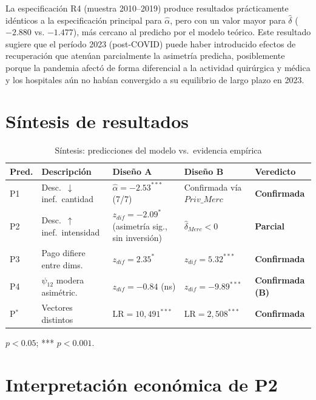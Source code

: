 \documentclass[12pt, a4paper, twoside, openright]{book}
\theoremstyle{plain}
\theoremstyle{definition}
\theoremstyle{remark}
\begin{document}
La especificación R4 (muestra 2010--2019) produce resultados prácticamente idénticos a la especificación principal para $\hat{\alpha}$, pero con un valor mayor para $\hat{\delta}$ ($-2.880$ vs. $-1.477$), más cercano al predicho por el modelo teórico. Este resultado sugiere que el período 2023 (post-COVID) puede haber introducido efectos de recuperación que atenúan parcialmente la asimetría predicha, posiblemente porque la pandemia afectó de forma diferencial a la actividad quirúrgica y médica y los hospitales aún no habían convergido a su equilibrio de largo plazo en 2023.

\section{Síntesis de resultados}

\begin{table}[htbp]
\centering
\caption{Síntesis: predicciones del modelo vs.\ evidencia empírica}
\label{tab:sintesis}
\begin{threeparttable}
\small
\begin{tabular}{p{0.8cm}p{3.5cm}p{3cm}p{3cm}p{1.5cm}}
\toprule
\textbf{Pred.} & \textbf{Descripción} &
\textbf{Diseño A} & \textbf{Diseño B} &
\textbf{Veredicto} \\
\midrule
P1 & Desc.\ $\downarrow$ inef.\ cantidad
  & $\hat{\alpha}=-2.53^{***}$ (7/7)
  & Confirmada vía $Priv\_Merc$
  & \textbf{Confirmada} \\[6pt]
P2 & Desc.\ $\uparrow$ inef.\ intensidad
  & $z_{dif}=-2.09^{*}$ (asimetría sig., sin inversión)
  & $\hat{\delta}_{Merc}<0$
  & \textbf{Parcial} \\[6pt]
P3 & Pago difiere entre dims.
  & $z_{dif}=2.35^{*}$
  & $z_{dif}=5.32^{***}$
  & \textbf{Confirmada} \\[6pt]
P4 & $\psi_{12}$ modera asimétric.
  & $z_{dif}=-0.84$ (ns)
  & $z_{dif}=-9.89^{***}$
  & \textbf{Confirmada (B)} \\[6pt]
P$^*$ & Vectores distintos
  & LR$=10{,}491^{***}$
  & LR$=2{,}508^{***}$
  & \textbf{Confirmada} \\
\bottomrule
\end{tabular}
\begin{tablenotes}
  \small
  \item * $p<0.05$; *** $p<0.001$.
\end{tablenotes}
\end{threeparttable}
\end{table}

\section{Interpretación económica de P2}
\end{document}
